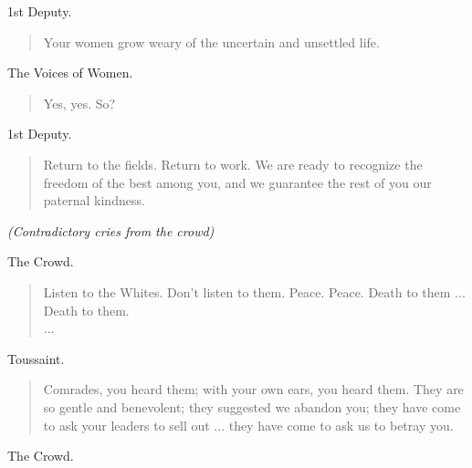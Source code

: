 \documentclass[letterpaper,article,12pt,oneside,notitlepage]{memoir}
\begin{document}
\begin{center}1st Deputy.\end{center}

\begin{verse}
\hspace{1cm} Your women grow weary of the uncertain and unsettled life. \\
\end{verse}

\begin{center}The Voices of Women.\end{center}

\begin{verse}
\hspace{1cm} Yes, yes. So? \\
\end{verse}

\begin{center}1st Deputy.\end{center}

\begin{verse}
\indent Return to the fields. Return to work. We are ready to recognize the freedom of the best among you, and we guarantee the rest of you our paternal kindness. \\
\end{verse}

\textit{(Contradictory cries from the crowd)}

\begin{center}The Crowd.\end{center}

\begin{verse}
\hspace{1cm} Listen to the Whites. Don't listen to them. Peace. Peace. Death to them ... Death to them. \\
... \\
\end{verse}

\begin{center}Toussaint.\end{center}

\begin{verse}
\indent Comrades, you heard them; with your own ears, you heard them. They are so gentle and benevolent; they suggested we abandon you; they have come to ask your leaders to sell out ... they have come to ask us to betray you. \\
\end{verse}

\begin{center}The Crowd.\end{center}
\end{document}
